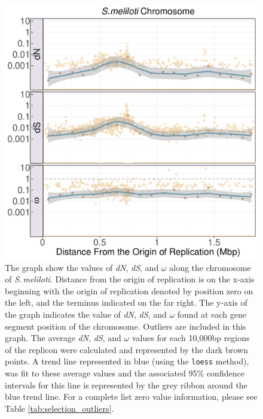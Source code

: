 \documentclass[11pt]{article}
\newcommand{\smel}{\textit{S.\,meliloti}\xspace}
\newcommand{\dn}{\textit{dN}\xspace}
\newcommand{\ds}{\textit{dS}\xspace}
\begin{document}
\begin{figure}[h]
	\begin{center}
		\includegraphics[width=\textwidth]{./figs/sinoC_dN_dS_omega_dist_NO_OUTLIERS.pdf}
		\caption{\label{fig:sinoC_selection_no_outliers}The graph show the values of \dn, \ds, and $\omega$ along the chromosome of \smel. Distance from the origin of replication is on the x-axis beginning with the origin of replication denoted by position zero on the left, and the terminus indicated on the far right. The y-axis of the graph indicates the value of \dn, \ds, and $\omega$ found at each gene segment position of the chromosome. Outliers are included in this graph. The average \dn, \ds, and $\omega$ values for each 10,000bp regions of the replicon were calculated and represented by the dark brown points. A trend line represented in blue (using the \texttt{loess} method), was fit to these average values and the associated 95\% confidence intervals for this line is represented by the grey ribbon around the blue trend line. For a complete list zero value information, please see Table \ref{tab:selection_outliers}.}
	\end{center}
\end{figure}



\newpage
\clearpage

\printbibliography[heading=bibintoc]
\end{document}
